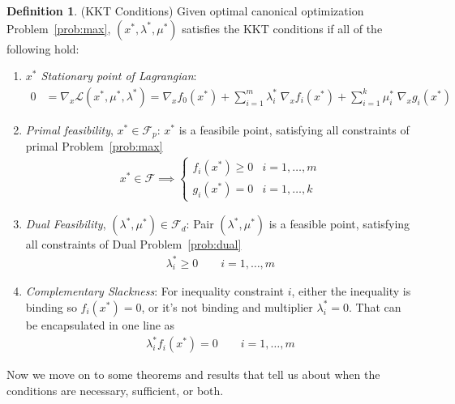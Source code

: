 \documentclass[12pt]{article}
\numberwithin{equation}{section} %
\theoremstyle{plain}
\theoremstyle{definition}
\newtheorem{defn}[thm]{Definition}
\theoremstyle{remark}
\newcommand{\sL}{\mathscr{L}}
\begin{document}

\begin{defn}{(KKT Conditions)}
Given optimal canonical optimization Problem~\ref{prob:max},
$(x^*,\lambda^*,\mu^*)$ satisfies the KKT conditions if all of the
following hold:
\begin{enumerate}
  \item \emph{$x^*$ Stationary point of Lagrangian}:
    \begin{align*}
      0 &= \nabla_x \sL(x^*,\mu^*,\lambda^*)
        = \nabla_x f_0(x^*)
        + \sum^m_{i=1} \lambda_i^* \; \nabla_x f_i(x^*)
        + \sum^k_{i=1} \mu_i^* \; \nabla_xg_i(x^*)
    \end{align*}
  \item \emph{Primal feasibility}, $x^*\in \mathscr{F}_p$: $x^*$ is a
    feasibile point, satisfying all constraints of primal
    Problem~\ref{prob:max}
    \begin{align*}
      x^*\in \mathscr{F}
      \implies
      \begin{cases}
        f_i(x^*)\geq 0 & i = 1,\ldots,m\\
        g_i(x^*)= 0 & i = 1,\ldots,k
      \end{cases}
    \end{align*}

  \item \emph{Dual Feasibility}, $(\lambda^*,\mu^*)\in\mathscr{F}_d$:
    Pair $(\lambda^*,\mu^*)$ is a feasible point, satisfying all
    constraints of Dual Problem~\ref{prob:dual}
    \begin{align*}
      \lambda^*_i \geq 0
      \qquad i=1,\ldots,m
    \end{align*}

  \item \emph{Complementary Slackness}: For inequality constraint $i$,
    either the inequality is binding so $f_i(x^*)=0$, or it's not
    binding and multiplier $\lambda^*_i=0$. That can be encapsulated in
    one line as
    \begin{align}
      \label{kkt:slackness}
      \lambda_i^* f_i(x^*) =0
      \qquad i=1,\ldots,m
    \end{align}
\end{enumerate}
Now we move on to some theorems and results that tell us about when the
conditions are necessary, sufficient, or both.
\end{defn}
\end{document}
